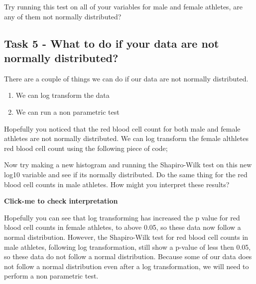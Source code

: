 \documentclass[
]{book}
\newenvironment{Shaded}{\begin{snugshade}}{\end{snugshade}}
\newcommand{\AttributeTok}[1]{\textcolor[rgb]{0.13,0.29,0.53}{#1}}
\newcommand{\CommentTok}[1]{\textcolor[rgb]{0.56,0.35,0.01}{\textit{#1}}}
\newcommand{\FunctionTok}[1]{\textcolor[rgb]{0.13,0.29,0.53}{\textbf{#1}}}
\newcommand{\NormalTok}[1]{#1}
\newcommand{\OtherTok}[1]{\textcolor[rgb]{0.56,0.35,0.01}{#1}}
\newcommand{\SpecialCharTok}[1]{\textcolor[rgb]{0.81,0.36,0.00}{\textbf{#1}}}
\providecommand{\tightlist}{%
  \setlength{\itemsep}{0pt}\setlength{\parskip}{0pt}}
\begin{document}
Try running this test on all of your variables for male and female athletes, are any of them not normally distributed?

\subsection{Task 5 - What to do if your data are not normally distributed?}\label{task-5---what-to-do-if-your-data-are-not-normally-distributed}

There are a couple of things we can do if our data are not normally distributed.

\begin{enumerate}
\def\labelenumi{\arabic{enumi})}
\tightlist
\item
  We can log transform the data
\item
  We can run a non parametric test
\end{enumerate}

Hopefully you noticed that the red blood cell count for both male and female athletes are not normally distributed. We can log transform the female althletes red blood cell count using the following piece of code;

\begin{Shaded}
\end{Shaded}

Now try making a new histogram and running the Shapiro-Wilk test on this new log10 variable and see if its normally distributed. Do the same thing for the red blood cell counts in male athletes. How might you interpret these results?

\textbf{Click-me to check interpretation}

Hopefully you can see that log transforming has increased the p value for red blood cell counts in female athletes, to above 0.05, so these data now follow a normal distribution. However, the Shapiro-Wilk test for red blood cell counts in male athletes, following log transformation, still show a p-value of less then 0.05, so these data do not follow a normal distribution. Because some of our data does not follow a normal distribution even after a log transformation, we will need to perform a non parametric test.
\end{document}
